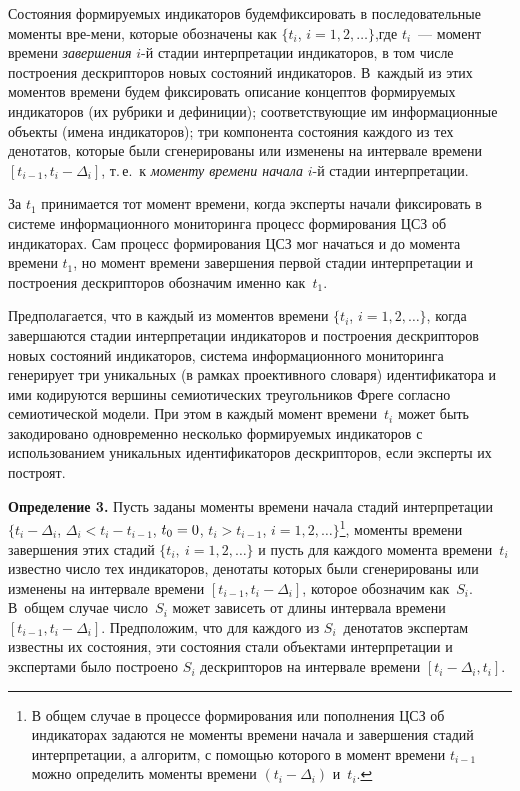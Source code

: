 \begin{multicols}{2}
   Состояния формируемых индикаторов будем\linebreak фиксировать в последовательные моменты 
вре-\linebreak мени, которые обозначены как $\{t_i$, $i=1, 2, \ldots\}$,\linebreak где $t_i$~--- момент 
времени \textit{завершения} $i$-й стадии интерпретации индикаторов, в том чис\-ле 
по\-стро\-ения дескрипторов новых состояний индикаторов. В~каж\-дый из этих моментов 
времени будем фиксировать описание концептов формируемых индикаторов (их рубрики 
и дефиниции); соответствующие им информационные объекты (имена индикаторов); 
три компонента состояния каждого из тех денотатов, которые были сгенерированы или 
изменены на интервале времени $[t_{i-1}, t_i - \Delta_i]$, т.\,е.\ к \textit{моменту времени 
начала} $i$-й стадии интерпретации.
{

}
   
   За $t_1$ принимается тот момент времени, когда эксперты начали фиксировать в системе 
информационного мониторинга процесс формирования ЦСЗ об индикаторах. Сам процесс 
формирования ЦСЗ мог начаться и до момента времени $t_1$, но момент времени 
завершения первой стадии интерпретации и построения дескрипторов обозначим именно 
как~$t_1$.
   
   Предполагается, что в каждый из моментов времени $\{t_i$, $i=1, 2, \ldots\}$, когда 
завершаются \mbox{стадии} интерпретации индикаторов и построения дескрипторов новых 
состояний индикаторов, сис\-те\-ма информационного мониторинга генерирует три уникальных 
(в рамках проективного словаря) идентификатора и ими кодируются вершины 
семиотических треугольников Фреге согласно семиотической модели. При этом в каждый 
момент времени~$t_i$ может быть закодировано одновременно несколько 
формируемых индикаторов с использованием уникальных идентификаторов дескрипторов, 
если эксперты их построят.
   
   \smallskip
   
   \noindent
   \textbf{Определение 3.} Пусть заданы моменты времени начала стадий 
интерпретации $\{t_i -\Delta_i$, $\Delta_i < t_i - t_{i-1}$, 
$t_0\hm=0$, $t_i > t_{i-1}$, $i=1, 2, 
\ldots\}$\footnote{В общем случае в процессе формирования или пополнения ЦСЗ об индикаторах задаются 
не моменты времени начала и завершения стадий интерпретации, а алгоритм, с помощью которого в момент 
времени $t_{i-1}$ можно определить моменты времени $(t_i - \Delta_i)$ и~$t_i$.}, моменты времени 
завершения этих стадий $\{t_i,\ i=1, 2, \ldots\}$ и пусть для каждого момента времени~$t_i$ 
известно число тех индикаторов, денотаты которых были сгенерированы или изменены на 
интервале времени $[t_{i-1}, t_i -\Delta_i]$, которое обозначим как~$S_i$. В~общем случае 
чис\-ло~$S_i$ может зависеть от длины интервала времени $[t_{i-1}, t_i - \Delta_i]$. 
Предположим, что для каждого из $S_i$~денотатов экспертам известны их состояния, эти 
состояния стали объектами интерпретации и экспертами было построено $S_i$ дескрипторов 
на интервале времени $[t_i - \Delta_i, t_i]$.
   

\end{multicols}
